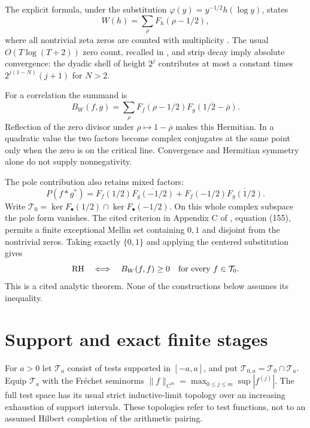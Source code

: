 \documentclass[11pt,letterpaper]{article}
\theoremstyle{definition}
\theoremstyle{remark}
\newcommand{\T}{\mathcal T}
\begin{document}
The explicit formula, under the substitution
$\varphi(y)=y^{-1/2}h(\log y)$, states
\begin{equation}
 W(h)=\sum_\rho F_h(\rho-1/2),
 \label{eq:zeros}
\end{equation}
where all nontrivial zeta zeros are counted with multiplicity
\cite[Appendix B, equations (147) to (150)]{CC20}.
The usual $O(T\log(T+2))$ zero count, recalled in
\cite[Section 2]{C26}, and strip decay imply absolute convergence:
the dyadic shell of height $2^j$ contributes at most a constant times
$2^{j(1-N)}(j+1)$ for $N>2$.

For a correlation the summand is
\begin{equation}
 B_W(f,g)=\sum_\rho F_f(\rho-1/2)
                 \overline{F_g(1/2-\overline\rho)}.
 \label{eq:mixed-zero}
\end{equation}
Reflection of the zero divisor under $\rho\mapsto1-\overline\rho$
makes this Hermitian. In a quadratic value the two factors become
complex conjugates at the same point only when the zero is on the
critical line. Convergence and Hermitian symmetry alone do not supply
nonnegativity.

The pole contribution also retains mixed factors:
\begin{equation}
 P(f*g^*)=F_f(1/2)\overline{F_g(-1/2)}
          +F_f(-1/2)\overline{F_g(1/2)}.
 \label{eq:mixed-poles}
\end{equation}
Write $\T_0=\ker F_{\bullet}(1/2)\cap\ker F_{\bullet}(-1/2)$.
On this whole complex subspace the pole form vanishes. The cited
criterion in Appendix C of \cite{CC20}, equation (155), permits a
finite exceptional Mellin set containing $0,1$ and disjoint from the
nontrivial zeros. Taking exactly $\{0,1\}$ and applying the centered
substitution gives
\begin{equation}
 \mathrm{RH}\quad\Longleftrightarrow\quad
 B_W(f,f)\ge0\quad\hbox{for every }f\in\T_0.
 \label{eq:T0-criterion}
\end{equation}
This is a cited analytic theorem. None of the constructions below
assumes its inequality.

\section{Support and exact finite stages}

For $a>0$ let $\T_a$ consist of tests supported in $[-a,a]$, and
put $\T_{0,a}=\T_0\cap\T_a$. Equip $\T_a$ with the Fr\'echet
seminorms $\|f\|_{C^m}=\max_{0\le j\le m}\sup|f^{(j)}|$.
The full test space has its usual strict inductive-limit topology
over an increasing exhaustion of support intervals. These topologies
refer to test functions, not to an assumed Hilbert completion of the
arithmetic pairing.
\end{document}
